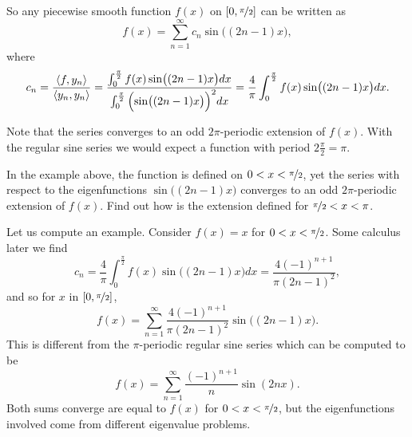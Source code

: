 \documentclass{ximera}
\begin{document}
\begin{example}
    So any piecewise smooth function $f(x)$ on $[0,\nicefrac{\pi}{2}]$ can be written as
    \begin{equation*}
        f(x) = \sum_{n=1}^\infty c_n \sin \bigl( (2n-1)x \bigr) ,
    \end{equation*}
    where
    \begin{equation*}
        c_n = \frac{\langle f , y_n \rangle}{\langle y_n , y_n \rangle} 
        = \frac{\int_0^{\frac{\pi}{2}} f(x)  \sin \bigl( (2n-1)x \bigr)  dx }{\int_0^{\frac{\pi}{2}} {\Bigl(\sin \bigl((2n-1)x\bigr)\Bigr)}^2  dx}
        = \frac{4}{\pi} \int_0^{\frac{\pi}{2}} f(x) \sin \bigl( (2n-1)x \bigr)  dx .
    \end{equation*}
    
    Note that the series converges to an odd $2\pi$-periodic extension of $f(x)$.  With the regular sine series we would expect a function with period $2  \frac{\pi}{2} = \pi$.
    
    \begin{exercise}%
        In the example above, the function is defined on $0 < x < \nicefrac{\pi}{2}$, yet the series with respect to the eigenfunctions $\sin \bigl( (2n-1)x \bigr)$ converges to an odd $2\pi$-periodic extension of $f(x)$. Find out how is the extension defined for $\nicefrac{\pi}{2} < x < \pi$.
    \end{exercise}
    
    Let us compute an example. Consider $f(x) = x$ for $0 < x <  \nicefrac{\pi}{2}$.  Some calculus later we find
    \begin{equation*}
        c_n =  \frac{4}{\pi} \int_0^{\frac{\pi}{2}} f(x) \sin \bigl( (2n-1)x \bigr)  dx 
        = \frac{4{(-1)}^{n+1}}{\pi {(2n-1)}^2} ,
    \end{equation*}
    and so for $x$ in $[0,\nicefrac{\pi}{2}]$,
    \begin{equation*}
        f(x) = \sum_{n=1}^\infty \frac{4{(-1)}^{n+1}}{\pi {(2n-1)}^2} \sin \bigl( (2n-1)x \bigr) .
    \end{equation*}
    This is different from the $\pi$-periodic regular sine series which can be computed to be
    \begin{equation*}
        f(x) = \sum_{n=1}^\infty \frac{{(-1)}^{n+1}}{n}  \sin ( 2nx ) .
    \end{equation*}
    Both sums converge are equal to $f(x)$ for $0 < x < \nicefrac{\pi}{2}$, but the eigenfunctions involved come from different eigenvalue problems.
\end{example}
\end{document}
